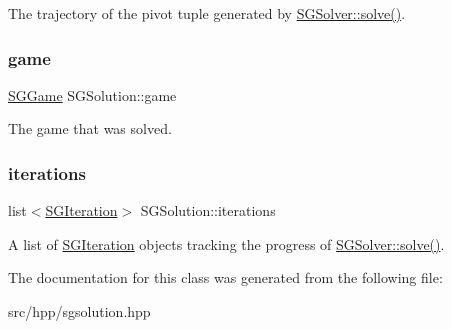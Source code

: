 The trajectory of the pivot tuple generated by \hyperlink{classSGSolver_a220dd431eabdd9ff8419fafb28b7b990}{S\+G\+Solver\+::solve()}. \mbox{\label{classSGSolution_a7358a0ff1476b3dd1eefaa96f2efd8ed}} 
\subsubsection{\texorpdfstring{game}{game}}
{\footnotesize\ttfamily \hyperlink{classSGGame}{S\+G\+Game} S\+G\+Solution\+::game\hspace{0.3cm}{\ttfamily [private]}}

The game that was solved. \mbox{\label{classSGSolution_a7216ae67bed2fb1ede826053c1612fcb}} 
\subsubsection{\texorpdfstring{iterations}{iterations}}
{\footnotesize\ttfamily list$<$\hyperlink{classSGIteration}{S\+G\+Iteration}$>$ S\+G\+Solution\+::iterations\hspace{0.3cm}{\ttfamily [private]}}

A list of \hyperlink{classSGIteration}{S\+G\+Iteration} objects tracking the progress of \hyperlink{classSGSolver_a220dd431eabdd9ff8419fafb28b7b990}{S\+G\+Solver\+::solve()}. 

The documentation for this class was generated from the following file\+:\begin{DoxyCompactItemize}
\item 
src/hpp/sgsolution.\+hpp\end{DoxyCompactItemize}
